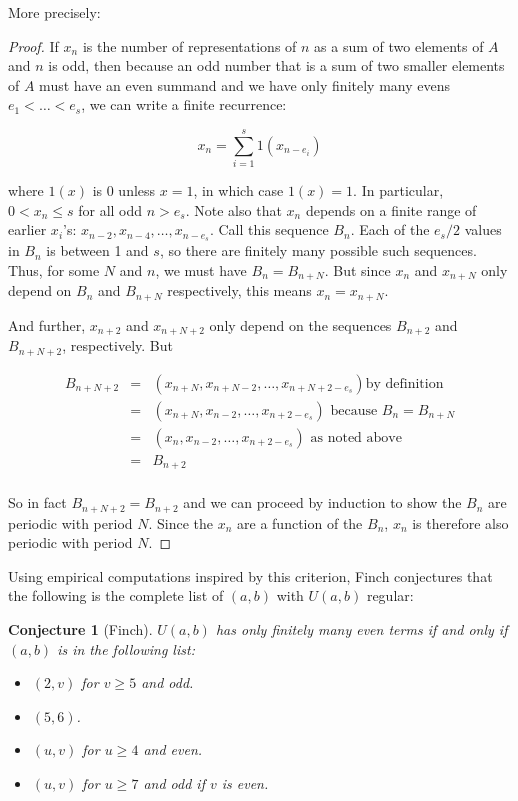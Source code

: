 \documentclass{report}
\newtheorem{conjecture}[theorem]{Conjecture}
\theoremstyle{remark}
\numberwithin{equation}{section}
\begin{document}
More precisely:

\begin{proof}

  If $x_n$ is the number of representations of $n$ as a sum of two
  elements of $A$ and $n$ is odd, then because an odd number that is a
  sum of two smaller elements of $A$ must have an even summand and we
  have only finitely many evens $e_1 < \ldots < e_s$, we can write a
  finite recurrence:

  \[x_n = \sum_{i=1}^s 1(x_{n-e_i})\]
  
  where $1(x)$ is 0 unless $x = 1$, in which case $1(x) = 1$.  In
  particular, $0 < x_n \leq s$ for all odd $n > e_s$.  Note also that
  $x_n$ depends on a finite range of earlier $x_i$'s:
  $x_{n-2}, x_{n-4}, \ldots, x_{n-e_s}$.  Call this sequence $B_n$.
  Each of the $e_s/2$ values in $B_n$ is between 1 and $s$, so there
  are finitely many possible such sequences.  Thus, for some $N$ and
  $n$, we must have $B_n = B_{n+N}$.  But since $x_n$ and $x_{n+N}$
  only depend on $B_n$ and $B_{n+N}$ respectively, this means
  $x_n = x_{n+N}$.

  And further, $x_{n+2}$ and $x_{n+N+2}$ only depend on the sequences
  $B_{n+2}$ and $B_{n+N+2}$, respectively.  But 

  \begin{eqnarray*}
    B_{n+N+2} &=& (x_{n+N}, x_{n+N-2}, \ldots, x_{n+N+2-e_s}) \text{
    by definition}\\
    &=& (x_{n+N}, x_{n-2}, \ldots, x_{n+2-e_s}) \text{ because $B_n
                                                  = B_{n+N}$}\\
    &=& (x_{n}, x_{n-2}, \ldots, x_{n+2-e_s}) \text{ as noted
                                                above}\\
              &=& B_{n+2}\\
  \end{eqnarray*}

  So in fact $B_{n+N+2} = B_{n+2}$ and we can proceed by induction to
  show the $B_n$ are periodic with period $N$.  Since the $x_n$ are a
  function of the $B_n$, $x_n$ is therefore also periodic with period
  $N$.
\end{proof}

Using empirical computations inspired by this criterion, Finch
conjectures \cite{finch:em1992} that the following is the complete
list of $(a,b)$ with $U(a,b)$ regular:

\begin{conjecture}[Finch]
  $U(a,b)$ has only finitely many even terms if and only if $(a,b)$ is
  in the following list:

\begin{itemize}
\item $(2,v)$ for $v \geq 5$ and odd.
\item $(5,6)$.
\item $(u,v)$ for $u \geq 4$ and even.
\item $(u,v)$ for $u \geq 7$ and odd if $v$ is even.
\end{itemize}
\end{conjecture}
\end{document}
